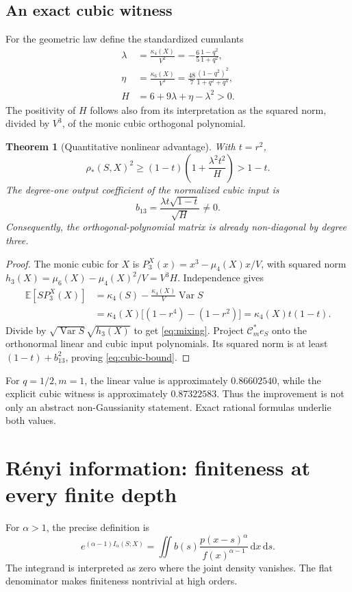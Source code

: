 \documentclass[11pt,a4paper]{article}
\numberwithin{equation}{section}
\newtheorem{theorem}{Theorem}[section]
\theoremstyle{definition}\newtheorem{definition}[theorem]{Definition}
\theoremstyle{remark}\newtheorem{remark}[theorem]{Remark}
\newcommand{\E}{\mathbb E}\newcommand{\Pp}{\mathbb P}
\newcommand{\Var}{\operatorname{Var}}\newcommand{\Cov}{\operatorname{Cov}}
\newcommand{\dd}{\,\mathrm d}\newcommand{\ii}{\mathrm i}
\newcommand{\calC}{\mathcal C_m}\newcommand{\calP}{\mathcal P}
\begin{document}
\subsection{An exact cubic witness}
For the geometric law define the standardized cumulants
\begin{align}
 \lambda&=\frac{\kappa_4(X)}{V^2}
 =-\frac65\frac{1-q^2}{1+q^2},\label{eq:lambda}\\
 \eta&=\frac{\kappa_6(X)}{V^3}
 =\frac{48}{7}\frac{(1-q^2)^2}{1+q^2+q^4},\label{eq:eta}\\
 H&=6+9\lambda+\eta-\lambda^2>0.
 \label{eq:H}
\end{align}
The positivity of $H$ follows also from its interpretation as the squared norm, divided by $V^3$, of the monic cubic orthogonal polynomial.
\begin{theorem}[Quantitative nonlinear advantage]
\label{thm:cubic}
With $t=r^2$,
\begin{equation}
 \rho_*(S,X)^2\ge(1-t)\left(1+\frac{\lambda^2t^2}{H}\right)>1-t.
 \label{eq:cubic-bound}
\end{equation}
The degree-one output coefficient of the normalized cubic input is
\begin{equation}
 b_{13}=\frac{\lambda t\sqrt{1-t}}{\sqrt H}\ne0.
 \label{eq:mixing}
\end{equation}
Consequently, the orthogonal-polynomial matrix is already non-diagonal by degree three.
\end{theorem}
\begin{proof}
The monic cubic for $X$ is $P_3^X(x)=x^3-\mu_4(X)x/V$, with squared norm
$h_3(X)=\mu_6(X)-\mu_4(X)^2/V=V^3H$.
Independence gives
\begin{align*}
 \E[S P_3^X(X)]
 &=\kappa_4(S)-\frac{\kappa_4(X)}V\Var S\\
 &=\kappa_4(X)\bigl[(1-r^4)-(1-r^2)\bigr]
 =\kappa_4(X)t(1-t).
\end{align*}
Divide by $\sqrt{\Var S}\sqrt{h_3(X)}$ to get \eqref{eq:mixing}. Project $\calC^*e_S$ onto the orthonormal linear and cubic input polynomials. Its squared norm is at least $(1-t)+b_{13}^2$, proving \eqref{eq:cubic-bound}.
\end{proof}
For $q=1/2,m=1$, the linear value is approximately $0.86602540$, while the explicit cubic witness is approximately $0.87322583$. Thus the improvement is not only an abstract non-Gaussianity statement. Exact rational formulas underlie both values.

\section{R\'enyi information: finiteness at every finite depth}
\label{sec:renyi-finite}
For $\alpha>1$, the precise definition is
\begin{equation}
 e^{(\alpha-1)I_\alpha(S;X)}
 =\iint b(s)\frac{p(x-s)^\alpha}{f(x)^{\alpha-1}}\dd x\dd s.
 \label{eq:renyi-definition}
\end{equation}
The integrand is interpreted as zero where the joint density vanishes. The flat denominator makes finiteness nontrivial at high orders.
\end{document}
